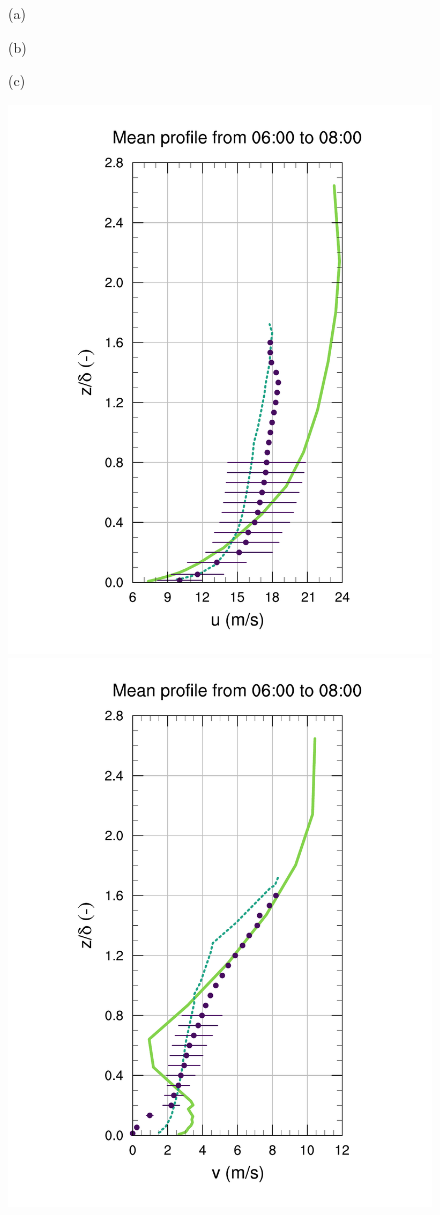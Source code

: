 \begin{figure}[H]
	\begin{minipage}{0.33\linewidth}
		\centering \hspace{1cm}(a)
	\end{minipage}%
	\begin{minipage}{0.33\linewidth}
		\centering \hspace{0.8cm}(b)
	\end{minipage}%
	\begin{minipage}{0.33\linewidth}
		\centering \hspace{1cm}(c)
	\end{minipage}%
	\vspace{-3mm}
	\begin{center}
	\includegraphics[height=0.61\linewidth,page=37,trim={35mm 10mm 38mm 25mm},clip]{Imagenes/06/hov_da/9u}%
	\includegraphics[height=0.61\linewidth,page=37,trim={48mm 10mm 38mm 25mm},clip]{Imagenes/06/hov_da/9v}%

\end{center}
\end{figure}
